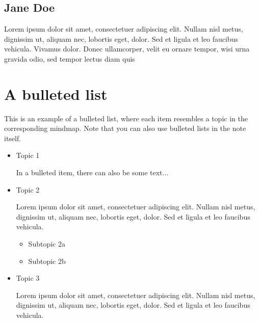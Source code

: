 \documentclass{article}
\begin{document}
\subsection{Jane Doe}
      


Lorem ipsum dolor sit amet, consectetuer adipiscing elit. Nullam 
nisl metus, dignissim ut, aliquam nec, lobortis eget, dolor. Sed et 
ligula et leo faucibus vehicula. Vivamus dolor. Donec ullamcorper, 
velit eu ornare tempor, wisi urna gravida odio, sed tempor lectus 
diam quis 

\section{A bulleted list}
      


This is an example of a bulleted list, where each item resembles 
a topic in the corresponding mindmap. Note that you can also 
use bulleted lists in the note itself.
\begin{itemize}
\item Topic 1




In a bulleted item, there can also be some text...
\item Topic 2




Lorem ipsum dolor sit amet, consectetuer adipiscing elit. Nullam 
nisl metus, dignissim ut, aliquam nec, lobortis eget, dolor. Sed et 
ligula et leo faucibus vehicula.
\begin{itemize}
\item Subtopic 2a

\item Subtopic 2b

\end{itemize}
      \item Topic 3




Lorem ipsum dolor sit amet, consectetuer adipiscing elit. Nullam 
nisl metus, dignissim ut, aliquam nec, lobortis eget, dolor. Sed et 
ligula et leo faucibus vehicula.
\end{itemize}
      
\end{document}
